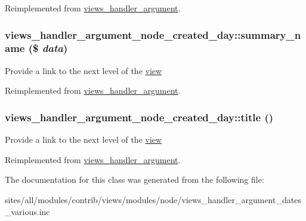 Reimplemented from \hyperlink{classviews__handler__argument_ad03acefdb44288d7e6c7793bc33f66c}{views\_\-handler\_\-argument}.\hypertarget{classviews__handler__argument__node__created__day_cd7fa6e862306ba955d314d464e1cf2d}{
\subsubsection[{summary\_\-name}]{\setlength{\rightskip}{0pt plus 5cm}views\_\-handler\_\-argument\_\-node\_\-created\_\-day::summary\_\-name (\$ {\em data})}}
\label{classviews__handler__argument__node__created__day_cd7fa6e862306ba955d314d464e1cf2d}


Provide a link to the next level of the \hyperlink{classview}{view} 

Reimplemented from \hyperlink{classviews__handler__argument_4c55a340453eed4d35c69f7ac790cac1}{views\_\-handler\_\-argument}.\hypertarget{classviews__handler__argument__node__created__day_bf71aafe50941da8e9ad6b4e1627833a}{
\subsubsection[{title}]{\setlength{\rightskip}{0pt plus 5cm}views\_\-handler\_\-argument\_\-node\_\-created\_\-day::title ()}}
\label{classviews__handler__argument__node__created__day_bf71aafe50941da8e9ad6b4e1627833a}


Provide a link to the next level of the \hyperlink{classview}{view} 

Reimplemented from \hyperlink{classviews__handler__argument_76181ac24e7be4a09aaafc1fa5f15ea1}{views\_\-handler\_\-argument}.

The documentation for this class was generated from the following file:\begin{CompactItemize}
\item 
sites/all/modules/contrib/views/modules/node/views\_\-handler\_\-argument\_\-dates\_\-various.inc\end{CompactItemize}
